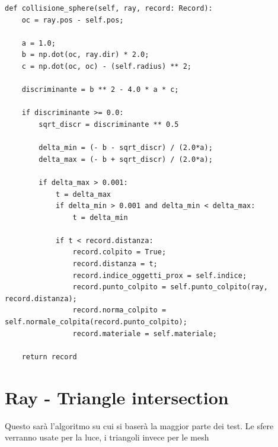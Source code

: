 \documentclass{article}
\begin{document}
\begin{lstlisting}[style=Pythonstyle, caption={Codice intersezione raggio - sfera}]
def collisione_sphere(self, ray, record: Record):
	oc = ray.pos - self.pos;
	
	a = 1.0;
	b = np.dot(oc, ray.dir) * 2.0;
	c = np.dot(oc, oc) - (self.radius) ** 2;

	discriminante = b ** 2 - 4.0 * a * c;
	
	if discriminante >= 0.0:
		sqrt_discr = discriminante ** 0.5
		
		delta_min = (- b - sqrt_discr) / (2.0*a);
		delta_max = (- b + sqrt_discr) / (2.0*a);
		
		if delta_max > 0.001:
			t = delta_max
			if delta_min > 0.001 and delta_min < delta_max:
				t = delta_min

			if t < record.distanza:
				record.colpito = True;
				record.distanza = t;
				record.indice_oggetti_prox = self.indice;
				record.punto_colpito = self.punto_colpito(ray, record.distanza);
				record.norma_colpito = self.normale_colpita(record.punto_colpito);
				record.materiale = self.materiale;
		
	return record
\end{lstlisting}

\newpage
\section{Ray - Triangle intersection}

Questo sarà l'algoritmo su cui si baserà la maggior parte dei test. Le sfere verranno usate per la luce, i triangoli invece per le mesh 

\end{document}
